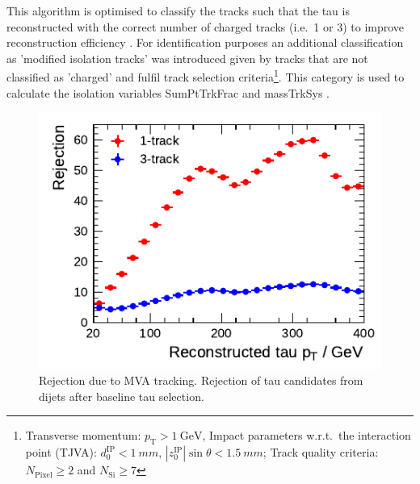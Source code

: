 
This algorithm is optimised to classify the
tracks such that the tau is reconstructed with the correct number of charged
tracks (i.e.\ 1 or 3) to improve reconstruction efficiency . For identification
purposes an additional classification as 'modified isolation tracks' was
introduced given by tracks that are not classified as 'charged' and fulfil track
selection criteria\footnote{Transverse momentum:
  $p_\mathrm{T} > \SI{1}{\giga\electronvolt}$, Impact parameters w.r.t.\ the
  interaction point (TJVA): $d_0^\text{IP} < \SI{1}{mm}$,
  $|z_0^\text{IP}| \sin\theta < \SI{1.5}{mm}$; Track quality criteria:
  $N_\text{Pixel} \geq 2$ and $N_\text{Si} \geq 7$}. This category is used to
calculate the isolation variables SumPtTrkFrac and massTrkSys .

%
%
%
%
%

\begin{figure}[ht]
  \centering
  \includegraphics{./figures/bdt_perf/mva_tracking_rejection.pdf}
  \caption{Rejection due to MVA tracking. Rejection of tau candidates from
    dijets after baseline tau selection.}
  \label{fig:mva_tracking_rejection}
\end{figure}

